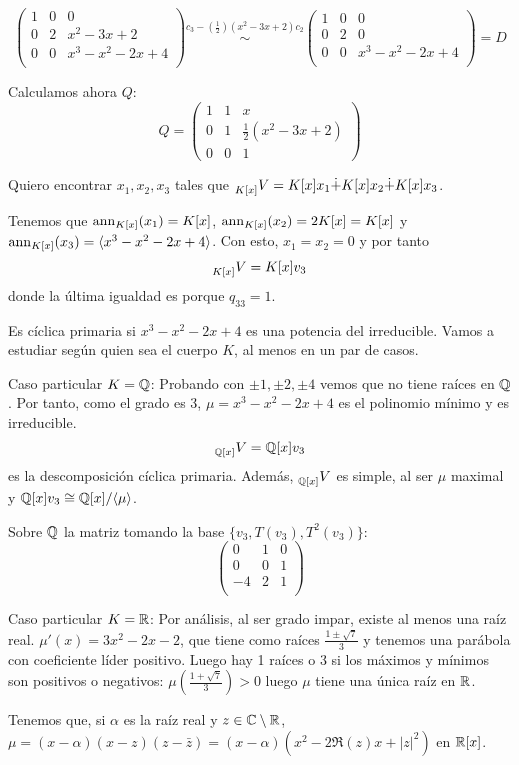 \[
  \begin{pmatrix}
    1   & 0   &  0  \\
    0   & 2    & x^2-3x+2  \\
    0   & 0    & x^3-x^2-2x+4  \\
  \end{pmatrix}
  \overset{c_3-(\frac{1}{2})(x^2-3x+2)c_2}{\sim}
  \begin{pmatrix}
    1   & 0   &  0  \\
    0   & 2    & 0\\
    0   & 0    & x^3-x^2-2x+4  \\
  \end{pmatrix} = D
\]

Calculamos ahora \(Q\):
\[
  Q=
  \begin{pmatrix}
    1 & 1 & x\\
    0 & 1 & \frac{1}{2}(x^2-3x+2)\\
    0 & 0 & 1
  \end{pmatrix}
\]

Quiero encontrar \(x_1, x_2, x_3\) tales que
\(\prescript{}{K[x]}{V} = K[x]x_1\dot{+}K[x]x_2\dot{+}K[x]x_3\).

Tenemos que \(\operatorname{ann}_{K[x]}(x_1)=K[x]\), \(\operatorname{ann}_{K[x]}(x_2)=2K[x]=K[x]\) y
\(\operatorname{ann}_{K[x]}(x_3)=\langle x^3-x^2-2x+4 \rangle\).
Con esto, \(x_1=x_2=0\) y por tanto
\[
  \prescript{}{K[x]}{V}=K[x]v_3
\]
donde la última igualdad es porque \(q_{33}=1\).

Es cíclica primaria si \( x^3-x^2-2x+4 \) es una potencia del irreducible.
Vamos a estudiar según quien sea el cuerpo \(K\), al menos en un par de
casos.

Caso particular \(K=\mathbb{Q}\): Probando con \(\pm 1, \pm 2, \pm 4\) vemos que
no tiene raíces en \(\mathbb{Q}\). Por tanto, como el grado es 3,
\(\mu= x^3-x^2-2x+4\) es el polinomio mínimo y es irreducible.
\[
  \prescript{}{\mathbb{Q}[x]}{V}=\mathbb{Q}[x]v_3
\]
es la descomposición cíclica primaria. Además, \(\prescript{}{\mathbb{Q}[x]}{V}\)
es simple, al ser \(\mu\) maximal y \(\mathbb{Q}[x]v_3\cong \mathbb{Q}[x]/\langle\mu\rangle\).

Sobre \(\mathbb{Q}\) la matriz tomando la base \(\{v_3,T(v_3),T^2(v_3)\}\):
\[  \begin{pmatrix}
       0 & 1 & 0\\
       0 & 0 & 1\\
       -4 & 2 & 1\\
     \end{pmatrix}
   \]

Caso particular \(K=\mathbb{R}\): Por análisis, al ser grado impar, existe al menos
una raíz real. \(\mu'(x)=3x^2-2x-2\), que tiene como raíces
\(\frac{1\pm\sqrt{7}}{3}\) y tenemos una parábola con coeficiente líder
positivo. Luego hay 1 raíces o 3 si los máximos y mínimos son positivos
o negativos: \(\mu(\frac{1+\sqrt{7}}{3})>0\) luego \(\mu\) tiene una única
raíz en \(\mathbb{R}\).

Tenemos que, si \(\alpha\) es la raíz real y \(z\in\mathbb{C}\setminus\mathbb{R}\),
\(\mu=(x-\alpha)(x-z)(z-\bar{z})=(x-\alpha)(x^2-2\Re(z)x+|z|^2)\) en \(\mathbb{R}[x]\).

